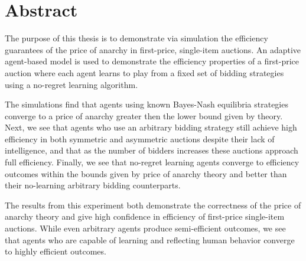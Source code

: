 \documentclass[12pt,twoside]{reedthesis}
\begin{document}
	
	

%
	

    \tableofcontents

    \chapter*{Abstract}
    
    The purpose of this thesis is to demonstrate via simulation the efficiency guarantees of the price of anarchy in first-price, single-item auctions. An adaptive agent-based model is used to demonstrate the efficiency properties of a first-price auction where each agent learns to play from a fixed set of bidding strategies using a no-regret learning algorithm.
    
    The simulations find that agents using known Bayes-Nash equilibria strategies converge to a price of anarchy greater then the lower bound given by theory. Next, we see that agents who use an arbitrary bidding strategy still achieve high efficiency in both symmetric and asymmetric auctions despite their lack of intelligence, and that as the number of bidders increases these auctions approach full efficiency. Finally, we see that no-regret learning agents converge to efficiency outcomes within the bounds given by price of anarchy theory and better than their no-learning arbitrary bidding counterparts. 
    
    The results from this experiment both demonstrate the correctness of the price of anarchy theory and give high confidence in efficiency of first-price single-item auctions. While even arbitrary agents produce semi-efficient outcomes, we see that agents who are capable of learning and reflecting human behavior converge to highly efficient outcomes. 
	
\end{document}
